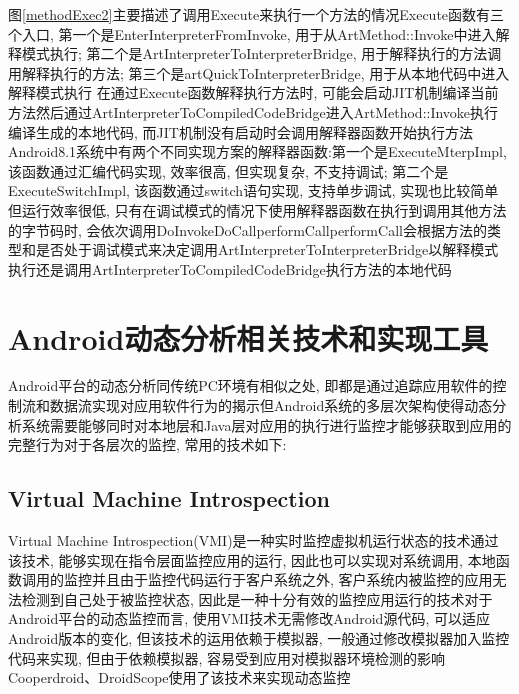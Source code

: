 图\ref{methodExec2}主要描述了调用Execute来执行一个方法的情况\juhao Execute函数有三个入口, 第一个是EnterInterpreterFromInvoke, 用于从ArtMethod::Invoke中进入解释模式执行; 第二个是ArtInterpreterToInterpreterBridge, 用于解释执行的方法调用解释执行的方法; 第三个是artQuickToInterpreterBridge, 用于从本地代码中进入解释模式执行\juhao
在通过Execute函数解释执行方法时, 可能会启动JIT机制编译当前方法然后通过ArtInterpreterToCompiledCodeBridge进入ArtMethod::Invoke执行编译生成的本地代码, 而JIT机制没有启动时会调用解释器函数开始执行方法\juhao Android8.1系统中有两个不同实现方案的解释器函数:第一个是ExecuteMterpImpl, 该函数通过汇编代码实现, 效率很高, 但实现复杂, 不支持调试; 第二个是ExecuteSwitchImpl, 该函数通过switch语句实现, 支持单步调试, 实现也比较简单但运行效率很低, 只有在调试模式的情况下使用\juhao 解释器函数在执行到调用其他方法的字节码时, 会依次调用DoInvoke\dunhao DoCall\dunhao performCall\juhao performCall会根据方法的类型和是否处于调试模式来决定调用ArtInterpreterToInterpreterBridge以解释模式执行还是调用ArtInterpreterToCompiledCodeBridge执行方法的本地代码\juhao 


\section{Android动态分析相关技术和实现工具}
Android平台的动态分析同传统PC环境有相似之处, 即都是通过追踪应用软件的控制流和数据流实现对应用软件行为的揭示\juhao 但Android系统的多层次架构使得动态分析系统需要能够同时对本地层和Java层对应用的执行进行监控才能够获取到应用的完整行为\juhao 对于各层次的监控, 常用的技术如下:



\subsection{Virtual Machine Introspection}
Virtual Machine Introspection(VMI)是一种实时监控虚拟机运行状态的技术\juhao 通过该技术, 能够实现在指令层面监控应用的运行, 因此也可以实现对系统调用, 本地函数调用的监控\juhao 并且由于监控代码运行于客户系统之外, 客户系统内被监控的应用无法检测到自己处于被监控状态, 因此是一种十分有效的监控应用运行的技术\juhao 对于Android平台的动态监控而言, 使用VMI技术无需修改Android源代码, 可以适应Android版本的变化, 但该技术的运用依赖于模拟器, 一般通过修改模拟器加入监控代码来实现, 但由于依赖模拟器, 容易受到应用对模拟器环境检测的影响\juhao Cooperdroid、DroidScope使用了该技术来实现动态监控\juhao

